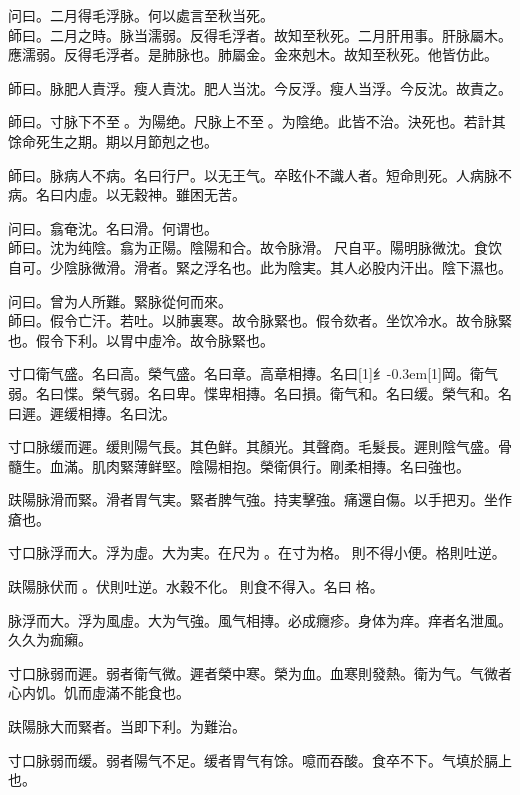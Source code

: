 \documentclass[11pt,oneside,b5paper]{ctexbook}
\begin{document}
\begin{flushleft}
问曰。二月得毛浮脉。何以處言至秋当死。\\
師曰。二月之時。脉当濡弱。反得毛浮者。故知至秋死。二月肝用事。肝脉屬木。應濡弱。反得毛浮者。是肺脉也。肺屬金。金來剋木。故知至秋死。他皆仿此。

師曰。脉肥人責浮。瘦人責沈。肥人当沈。今反浮。瘦人当浮。今反沈。故責之。

師曰。寸脉下不至{𬮦}。为陽绝。尺脉上不至{𬮦}。为陰绝。此皆不治。決死也。若計其馀命死生之期。期以月節剋之也。

師曰。脉病人不病。名曰行尸。以无王气。卒眩仆不識人者。短命則死。人病脉不病。名曰内虛。以无穀神。雖困无苦。

问曰。翕奄沈。名曰滑。何谓也。\\
師曰。沈为纯陰。翕为正陽。陰陽和合。故令脉滑。{𬮦}尺自平。陽明脉微沈。食饮自可。少陰脉微滑。滑者。緊之浮名也。此为陰実。其人必股内汗出。陰下濕也。

问曰。曾为人所難。緊脉從何而來。\\
師曰。假令亡汗。若吐。以肺裏寒。故令脉緊也。假令欬者。坐饮冷水。故令脉緊也。假令下利。以胃中虛冷。故令脉緊也。

寸口衛气盛。名曰高。榮气盛。名曰章。高章相摶。名曰{\hbox{\scalebox{0.6}[1]{纟}\kern-0.3em\scalebox{0.63}[1]{岡}}}。衛气弱。名曰惵。榮气弱。名曰卑。惵卑相摶。名曰損。衛气和。名曰缓。榮气和。名曰遲。遲缓相摶。名曰沈。

寸口脉缓而遲。缓則陽气長。其色鲜。其顏光。其聲商。毛髮長。遲則陰气盛。骨髓生。血滿。肌肉緊薄鲜堅。陰陽相抱。榮衛俱行。剛柔相摶。名曰強也。

趺陽脉滑而緊。滑者胃气実。緊者脾气強。持実擊強。痛還自傷。以手把刃。坐作瘡也。

寸口脉浮而大。浮为虛。大为実。在尺为{𬮦}。在寸为格。{𬮦}則不得小便。格則吐逆。

趺陽脉伏而{𬈧}。伏則吐逆。水穀不化。{𬈧}則食不得入。名曰{𬮦}格。

脉浮而大。浮为風虛。大为气強。風气相摶。必成癮疹。身体为痒。痒者名泄風。久久为痂癩。

寸口脉弱而遲。弱者衛气微。遲者榮中寒。榮为血。血寒則發熱。衛为气。气微者心内饥。饥而虛滿不能食也。

趺陽脉大而緊者。当即下利。为難治。

寸口脉弱而缓。弱者陽气不足。缓者胃气有馀。噫而吞酸。食卒不下。气填於膈上也。


\end{flushleft}
\end{document}
